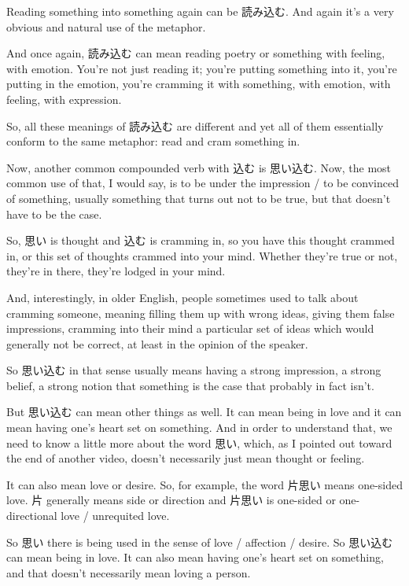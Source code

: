 Reading something into something again can be 読み込む. And again it's a very obvious and natural use of the metaphor.

And once again, 読み込む can mean reading poetry or something with feeling, with emotion. You're not just reading it; you're putting something into it, you're putting in the emotion, you're cramming it with something, with emotion, with feeling, with expression.

So, all these meanings of 読み込む are different and yet all of them essentially conform to the same metaphor: read and cram something in.

\stopsectionlevel

\startsectionlevel[title={思い込む},reference={思い込む}]

Now, another common compounded verb with 込む is 思い込む. Now, the most common use of that, I would say, is to be under the impression / to be convinced of something, usually something that turns out not to be true, but that doesn't have to be the case.

So, 思い is thought and 込む is cramming in, so you have this thought crammed in, or this set of thoughts crammed into your mind. Whether they're true or not, they're in there, they're lodged in your mind.

And, interestingly, in older English, people sometimes used to talk about cramming someone, meaning filling them up with wrong ideas, giving them false impressions, cramming into their mind a particular set of ideas which would generally not be correct, at least in the opinion of the speaker.

So 思い込む in that sense usually means having a strong impression, a strong belief, a strong notion that something is the case that probably in fact isn't.

But 思い込む can mean other things as well. It can mean being in love and it can mean having one's heart set on something. And in order to understand that, we need to know a little more about the word 思い, which, as I pointed out toward the end of another video, doesn't necessarily just mean thought or feeling.

It can also mean love or desire. So, for example, the word 片思い means one-sided love. 片 generally means side or direction and 片思い is one-sided or one-directional love / unrequited love.

So 思い there is being used in the sense of love / affection / desire. So 思い込む can mean being in love. It can also mean having one's heart set on something, and that doesn't necessarily mean loving a person.

